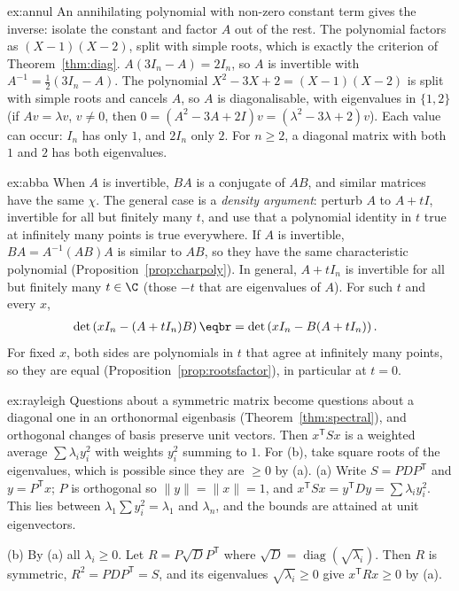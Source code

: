 \begin{solution}{ex:annul}
\idea An annihilating polynomial with non-zero constant term gives the inverse: isolate the constant and factor $A$ out of the rest. The polynomial factors as $(X-1)(X-2)$, split with simple roots, which is exactly the criterion of Theorem~\ref{thm:diag}.
\writeup $A(3I_n-A)=2I_n$, so $A$ is invertible with $A^{-1}=\frac12(3I_n-A)$. The polynomial $X^2-3X+2=(X-1)(X-2)$ is split with simple roots and cancels $A$,
so $A$ is diagonalisable, with eigenvalues in $\{1,2\}$ (if $Av=\lambda v$, $v\ne0$, then $0=(A^2-3A+2I)v=(\lambda^2-3\lambda+2)v$). Each value can occur: $I_n$ has only $1$, and $2I_n$ only $2$. For $n\ge2$, a diagonal matrix with both $1$ and $2$ has both eigenvalues.
\end{solution}

\begin{solution}{ex:abba}
\idea When $A$ is invertible, $BA$ is a conjugate of $AB$, and similar matrices have the same $\chi$. The general case is a \emph{density argument}: perturb $A$ to $A+tI$, invertible for all but finitely many $t$, and use that a polynomial identity in $t$ true at infinitely many points is true everywhere.
\writeup If $A$ is invertible, $BA=A^{-1}(AB)A$ is similar to $AB$, so they have the same characteristic polynomial (Proposition~\ref{prop:charpoly}). In general, $A+tI_n$ is invertible for all but finitely many $t\in\C$
(those $-t$ that are eigenvalues of $A$). For such $t$ and every $x$,
\[
\begin{aligned}&\det\left(xI_n-(A+tI_n)B\right)\eqbr=\det\left(xI_n-B(A+tI_n)\right).\end{aligned}
\]
For fixed $x$, both sides are polynomials in $t$ that agree at infinitely many points, so they are equal (Proposition~\ref{prop:rootsfactor}), in particular at $t=0$.
\end{solution}

\begin{solution}{ex:rayleigh}
\idea Questions about a symmetric matrix become questions about a diagonal one in an orthonormal eigenbasis (Theorem~\ref{thm:spectral}), and orthogonal changes of basis preserve unit vectors. Then $x^{\mathsf T}Sx$ is a weighted average $\sum\lambda_iy_i^2$ with weights $y_i^2$ summing to $1$. For (b), take square roots of the eigenvalues, which is possible since they are $\ge0$ by (a).
\writeup (a) Write $S=PDP^{\mathsf T}$ and $y=P^{\mathsf T}x$; $P$ is orthogonal so $\|y\|=\|x\|=1$, and $x^{\mathsf T}Sx=y^{\mathsf T}Dy=\sum\lambda_iy_i^2$. This lies between $\lambda_1\sum y_i^2=\lambda_1$
and $\lambda_n$, and the bounds are attained at unit eigenvectors.

(b) By (a) all $\lambda_i\ge0$. Let $R=P\sqrt DP^{\mathsf T}$ where $\sqrt D=\operatorname{diag}(\sqrt{\lambda_i})$. Then $R$ is symmetric, $R^2=PDP^{\mathsf T}=S$, and its eigenvalues
$\sqrt{\lambda_i}\ge0$ give $x^{\mathsf T}Rx\ge0$ by (a).
\end{solution}

